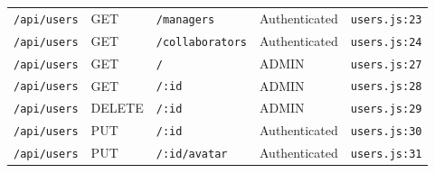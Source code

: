 \begin{landscape}
\begin{longtable}{p{}p{}p{}p{}p{}}
\texttt{/api/users} & GET & \texttt{/managers} & Authenticated & \texttt{users.js:23}\\
\texttt{/api/users} & GET & \texttt{/collaborators} & Authenticated & \texttt{users.js:24}\\
\texttt{/api/users} & GET & \texttt{/} & ADMIN & \texttt{users.js:27}\\
\texttt{/api/users} & GET & \texttt{/:id} & ADMIN & \texttt{users.js:28}\\
\texttt{/api/users} & DELETE & \texttt{/:id} & ADMIN & \texttt{users.js:29}\\
\texttt{/api/users} & PUT & \texttt{/:id} & Authenticated & \texttt{users.js:30}\\
\texttt{/api/users} & PUT & \texttt{/:id/avatar} & Authenticated & \texttt{users.js:31}\\
\bottomrule
\end{longtable}
\normalsize
\end{landscape}
